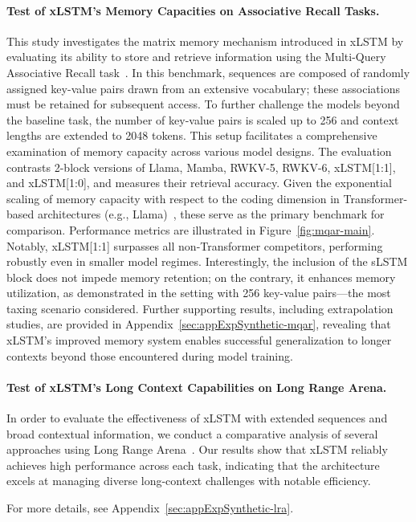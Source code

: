 \paragraph{Test of xLSTM's Memory Capacities on Associative Recall Tasks.} This study investigates the matrix memory mechanism introduced in xLSTM by evaluating its ability to store and retrieve information using the Multi-Query Associative Recall task~\citep{Arora:23arxiv}. In this benchmark, sequences are composed of randomly assigned key-value pairs drawn from an extensive vocabulary; these associations must be retained for subsequent access. To further challenge the models beyond the baseline task, the number of key-value pairs is scaled up to 256 and context lengths are extended to 2048 tokens. This setup facilitates a comprehensive examination of memory capacity across various model designs. The evaluation contrasts 2-block versions of Llama, Mamba, RWKV-5, RWKV-6, xLSTM[1:1], and xLSTM[1:0], and measures their retrieval accuracy. Given the exponential scaling of memory capacity with respect to the coding dimension in Transformer-based architectures (e.g., Llama)~\citep{Ramsauer:21}, these serve as the primary benchmark for comparison. Performance metrics are illustrated in Figure~\ref{fig:mqar-main}. Notably, xLSTM[1:1] surpasses all non-Transformer competitors, performing robustly even in smaller model regimes. Interestingly, the inclusion of the sLSTM block does not impede memory retention; on the contrary, it enhances memory utilization, as demonstrated in the setting with 256 key-value pairs—the most taxing scenario considered. Further supporting results, including extrapolation studies, are provided in Appendix~\ref{sec:appExpSynthetic-mqar}, revealing that xLSTM’s improved memory system enables successful generalization to longer contexts beyond those encountered during model training.

\paragraph{Test of xLSTM's Long Context Capabilities on Long Range Arena.} In order to evaluate the effectiveness of xLSTM with extended sequences and broad contextual information, we conduct a comparative analysis of several approaches using Long Range Arena~\citep{Tay:21}. Our results show that xLSTM reliably achieves high performance across each task, indicating that the architecture excels at managing diverse long-context challenges with notable efficiency.

For more details, see Appendix~\ref{sec:appExpSynthetic-lra}.

